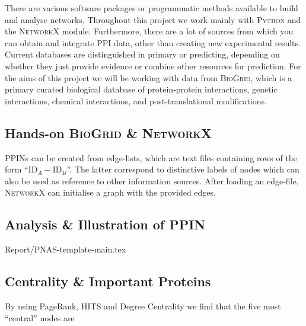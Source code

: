 \label{sec:2-task1}
There are various software packages or programmatic methods available to build and analyse networks. Throughout this project we work mainly with \textsc{Python} and the \textsc{NetworkX} module. Furthermore, there are a lot of sources from which you can obtain and integrate PPI data, other than creating new experimental results. Current databases are distinguished in primary or predicting, depending on whether they just provide evidence or combine other resources for prediction. For the aims of this project we will be working with data from \textsc{BioGrid}, which is a primary curated biological database of protein-protein interactions, genetic interactions, chemical interactions, and post-translational modifications.

\subsection{Hands-on \textsc{BioGrid} \& \textsc{NetworkX}}

PPINs can be created from edge-lists, which are text files containing rows of the form ``$\text{ID}_A - \text{ID}_B$''. The latter correspond to distinctive labels of nodes which can also be used as reference  to other information sources. After loading an edge-file, \textsc{NetworkX} can initialise a graph with the provided edges.

\subsection{Analysis \& Illustration of PPIN}
Report/PNAS-template-main.tex

\subsection{Centrality \& Important Proteins}
By using PageRank, HITS and Degree Centrality we find that the five most ``central'' nodes are

